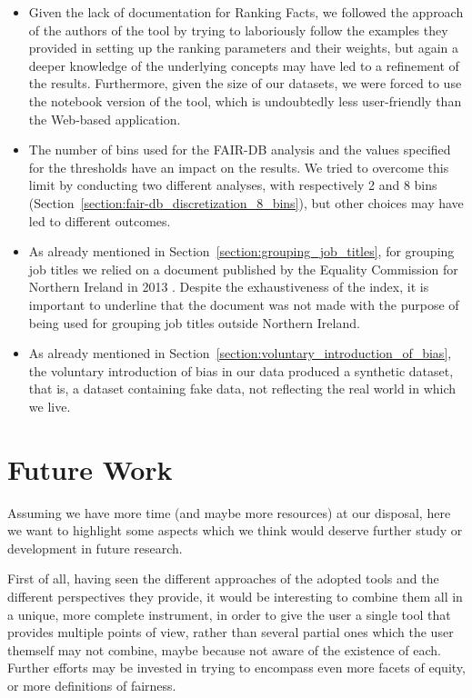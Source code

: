 \begin{itemize}
\item Given the lack of documentation for Ranking Facts, we followed the approach of the authors of the tool by trying to laboriously follow the examples they provided in setting up the ranking parameters and their weights, but again a deeper knowledge of the underlying concepts may have led to a refinement of the results. Furthermore, given the size of our datasets, we were forced to use the notebook version of the tool, which is undoubtedly less user-friendly than the Web-based application.
\item The number of bins used for the FAIR-DB analysis and the values specified for the thresholds have an impact on the results. We tried to overcome this limit by conducting two different analyses, with respectively 2 and 8 bins (Section~\ref{section:fair-db_discretization_8_bins}), but other choices may have led to different outcomes.
\item As already mentioned in Section~\ref{section:grouping_job_titles}, for grouping job titles we relied on a document published by the Equality Commission for Northern Ireland in 2013 \cite{equality2013index}. Despite the exhaustiveness of the index, it is important to underline that the document was not made with the purpose of being used for grouping job titles outside Northern Ireland.
\item As already mentioned in Section~\ref{section:voluntary_introduction_of_bias}, the voluntary introduction of bias in our data produced a synthetic dataset, that is, a dataset containing fake data, not reflecting the real world in which we live.
\end{itemize}


\section{Future Work}
Assuming we have more time (and maybe more resources) at our disposal, here we want to highlight some aspects which we think would deserve further study or development in future research.

First of all, having seen the different approaches of the adopted tools and the different perspectives they provide, it would be interesting to combine them all in a unique, more complete instrument, in order to give the user a single tool that provides multiple points of view, rather than several partial ones which the user themself may not combine, maybe because not aware of the existence of each. Further efforts may be invested in trying to encompass even more facets of equity, or more definitions of fairness.

